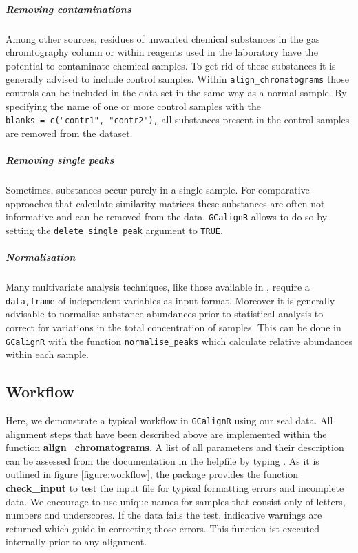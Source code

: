 \subparagraph{Removing contaminations}\label{removing-contaminations}

Among other sources, residues of unwanted chemical substances in the gas
chromtography column or within reagents used in the laboratory have the
potential to contaminate chemical samples. To get rid of these
substances it is generally advised to include control samples. Within
\texttt{align\_chromatograms} those controls can be included in the data
set in the same way as a normal sample. By specifying the name of one or
more control samples with the
\texttt{blanks\ =\ c("contr1",\ "contr2"),} all substances present in
the control samples are removed from the dataset.

\subparagraph{Removing single peaks}\label{removing-single-peaks}

Sometimes, substances occur purely in a single sample. For comparative
approaches that calculate similarity matrices these substances are often
not informative and can be removed from the data. \texttt{GCalignR}
allows to do so by setting the \texttt{delete\_single\_peak} argument to
\texttt{TRUE}.

\subparagraph{Normalisation}\label{normalisation}

Many multivariate analysis techniques, like those available in
, require a \texttt{data,frame} of independent variables as
input format. Moreover it is generally advisable to normalise substance
abundances prior to statistical analysis to correct for variations in
the total concentration of samples. This can be done in
\texttt{GCalignR} with the function \texttt{normalise\_peaks} which
calculate relative abundances within each sample.

\subsection{Workflow}\label{workflow}

Here, we demonstrate a typical workflow in \texttt{GCalignR} using our
seal data. All alignment steps that have been described above are
implemented within the function \textbf{align\_chromatograms}. A list of
all parameters and their description can be assessed from the
documentation in the helpfile by typing . As
it is outlined in figure \ref{figure:workflow}, the package provides the
function \textbf{check\_input} to test the input file for typical
formatting errors and incomplete data. We encourage to use unique names
for samples that consist only of letters, numbers and underscores. If
the data fails the test, indicative warnings are returned which guide in
correcting those errors. This function ist executed internally prior to
any alignment.

